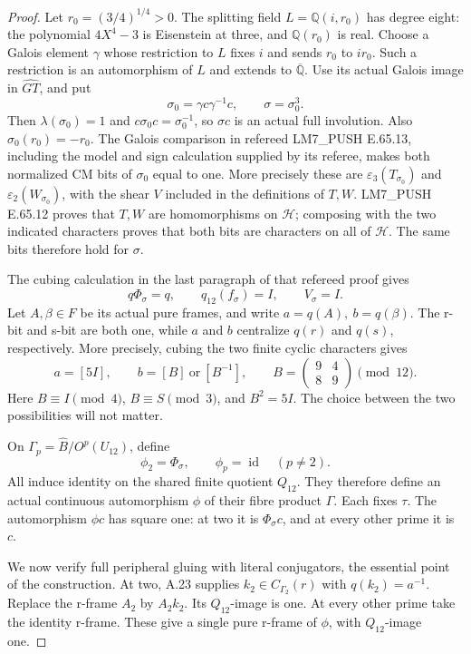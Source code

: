 \begin{proof}
Let \(r_0=(3/4)^{1/4}>0\). The splitting field
\(L=\mathbb Q(i,r_0)\) has degree eight: the
polynomial \(4X^4-3\) is Eisenstein at three,
and \(\mathbb Q(r_0)\) is real. Choose a Galois
element \(\gamma\) whose restriction to \(L\)
fixes \(i\) and sends \(r_0\) to \(ir_0\).
Such a restriction is an automorphism of \(L\)
and extends to \(\overline{\mathbb Q}\).
Use its actual Galois image in \(\widehat{GT}\),
and put
\[
 \sigma_0=\gamma c\gamma^{-1}c,
 \qquad \sigma=\sigma_0^3.
\]
Then \(\lambda(\sigma_0)=1\) and
\(c\sigma_0c=\sigma_0^{-1}\), so
\(\sigma c\) is an actual full involution.
Also \(\sigma_0(r_0)=-r_0\). The Galois comparison
in refereed LM7\_PUSH E.65.13, including the model
and sign calculation supplied by its referee,
makes both normalized CM bits of \(\sigma_0\) equal
to one. More precisely these are
\(\varepsilon_3(T_{\sigma_0})\) and
\(\varepsilon_2(W_{\sigma_0})\), with the shear
\(V\) included in the definitions of \(T,W\).
LM7\_PUSH E.65.12 proves that \(T,W\) are
homomorphisms on \(\mathcal H\); composing with
the two indicated characters proves that both
bits are characters on all of \(\mathcal H\).
The same bits therefore hold for \(\sigma\).

The cubing calculation in the last paragraph of
that refereed proof gives
\[
 q\Phi_\sigma=q,
 \qquad q_{12}(f_\sigma)=I,
 \qquad V_\sigma=I.
\]
Let \(A,\beta\in F\) be its actual pure frames,
and write \(a=q(A),\ b=q(\beta)\). The r-bit
and s-bit are both one, while \(a\) and \(b\)
centralize \(q(r)\) and \(q(s)\), respectively.
More precisely, cubing the two finite cyclic
characters gives
\[
 a=[5I],\qquad
 b=[B]\ \text{or}\ [B^{-1}],\qquad
 B=\begin{pmatrix}9&4\\8&9\end{pmatrix}\pmod{12}.
\]
Here \(B\equiv I\pmod4\), \(B\equiv S\pmod3\),
and \(B^2=5I\). The choice between the two
possibilities will not matter.

On \(\Gamma_p=\widehat B/O^p(U_{12})\), define
\[
 \phi_2=\Phi_\sigma,\qquad
 \phi_p=\operatorname{id}\quad(p\ne2).
\]
All induce identity on the shared finite quotient
\(Q_{12}\). They therefore define an actual
continuous automorphism \(\phi\) of their fibre
product \(\Gamma\). Each fixes \(\tau\).
The automorphism \(\phi c\) has square one:
at two it is \(\Phi_\sigma c\), and at every
other prime it is \(c\).

We now verify full peripheral gluing with literal
conjugators, the essential point of the construction.
At two, A.23 supplies \(k_2\in C_{\Gamma_2}(r)\)
with \(q(k_2)=a^{-1}\). Replace the r-frame
\(A_2\) by \(A_2k_2\). Its \(Q_{12}\)-image
is one. At every other prime take the identity
r-frame. These give a single pure r-frame of
\(\phi\), with \(Q_{12}\)-image one.


\end{proof}
